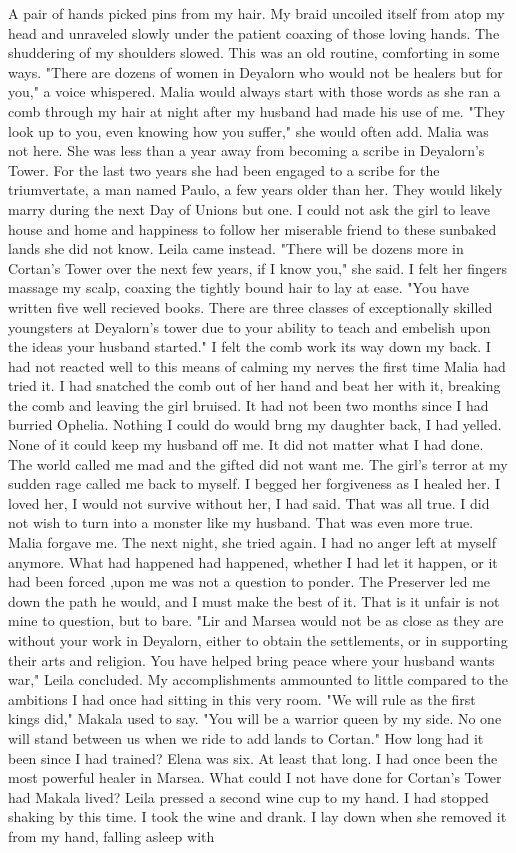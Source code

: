 \documentclass{article}
\begin{document}
A pair of hands picked pins from my hair. My braid uncoiled itself from atop my head and unraveled slowly under the patient coaxing of those loving hands. The shuddering of my shoulders slowed. This was an old routine, comforting in some ways. "There are dozens of women in Deyalorn who would not be healers but for you," a voice whispered. Malia would always start with those words as she ran a comb through my hair at night after my husband had made his use of me. "They look up to you, even knowing how you suffer," she would often add. Malia was not here. She was less than a year away from becoming a scribe in Deyalorn's Tower. For the last two years she had been engaged to a scribe for the triumvertate, a man named Paulo, a few years older than her. They would likely marry during the next Day of Unions but one. I could not ask the girl to leave house and home and happiness to follow her miserable friend to these sunbaked lands she did not know. Leila came instead. "There will be dozens more in Cortan's Tower over the next few years, if I know you," she said. I felt her fingers massage my scalp, coaxing the tightly bound hair to lay at ease. "You have written five well recieved books. There are three classes of exceptionally skilled youngsters at Deyalorn's tower due to your ability to teach and embelish upon the ideas your husband started." I felt the comb work its way down my back. I had not reacted well to this means of calming my nerves the first time Malia had tried it. I had snatched the comb out of her hand and beat her with it, breaking the comb and leaving the girl bruised. It had not been two months since I had burried Ophelia. Nothing I could do would brng my daughter back, I had yelled. None of it could keep my husband off me. It did not matter what I had done. The world called me mad and the gifted did not want me. The girl's terror at my sudden rage called me back to myself. I begged her forgiveness as I healed her. I loved her, I would not survive without her, I had said. That was all true. I did not wish to turn into a monster like my husband. That was even more true. Malia forgave me. The next night, she tried again. I had no anger left at myself anymore. What had happened had happened, whether I had let it happen, or it had been forced ,upon me was not a question to ponder. The Preserver led me down the path he would, and I must make the best of it. That is it unfair is not mine to question, but to bare. "Lir and Marsea would not be as close as they are without your work in Deyalorn, either to obtain the settlements, or in supporting their arts and religion. You have helped bring peace where your husband wants war," Leila concluded. My accomplishments ammounted to little compared to the ambitions I had once had sitting in this very room. "We will rule as the first kings did," Makala used to say. "You will be a warrior queen by my side. No one will stand between us when we ride to add lands to Cortan." How long had it been since I had trained? Elena was six. At least that long. I had once been the most powerful healer in Marsea. What could I not have done for Cortan's Tower had Makala lived? Leila pressed a second wine cup to my hand. I had stopped shaking by this time. I took the wine and drank. I lay down when she removed it from my hand, falling asleep with 
\end{document}
